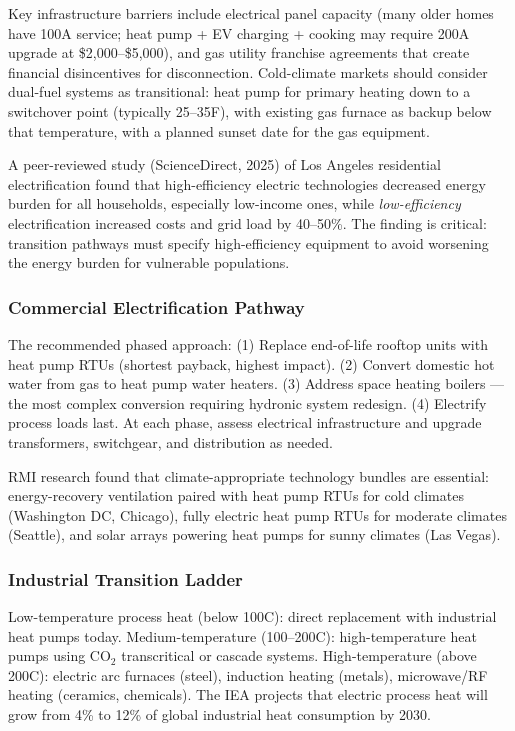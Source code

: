 \documentclass[11pt,letterpaper]{article}
\begin{document}
Key infrastructure barriers include electrical panel capacity (many older homes have 100A service; heat pump + EV charging + cooking may require 200A upgrade at \$2,000--\$5,000), and gas utility franchise agreements that create financial disincentives for disconnection. Cold-climate markets should consider dual-fuel systems as transitional: heat pump for primary heating down to a switchover point (typically 25--35\textdegree F), with existing gas furnace as backup below that temperature, with a planned sunset date for the gas equipment.

A peer-reviewed study (ScienceDirect, 2025) of Los Angeles residential electrification found that high-efficiency electric technologies decreased energy burden for all households, especially low-income ones, while \textit{low-efficiency} electrification increased costs and grid load by 40--50\%. The finding is critical: transition pathways must specify high-efficiency equipment to avoid worsening the energy burden for vulnerable populations.

\subsubsection{Commercial Electrification Pathway}
The recommended phased approach: (1) Replace end-of-life rooftop units with heat pump RTUs (shortest payback, highest impact). (2) Convert domestic hot water from gas to heat pump water heaters. (3) Address space heating boilers --- the most complex conversion requiring hydronic system redesign. (4) Electrify process loads last. At each phase, assess electrical infrastructure and upgrade transformers, switchgear, and distribution as needed.

RMI research found that climate-appropriate technology bundles are essential: energy-recovery ventilation paired with heat pump RTUs for cold climates (Washington DC, Chicago), fully electric heat pump RTUs for moderate climates (Seattle), and solar arrays powering heat pumps for sunny climates (Las Vegas).

\subsubsection{Industrial Transition Ladder}
Low-temperature process heat (below 100\textdegree C): direct replacement with industrial heat pumps today. Medium-temperature (100--200\textdegree C): high-temperature heat pumps using CO$_2$ transcritical or cascade systems. High-temperature (above 200\textdegree C): electric arc furnaces (steel), induction heating (metals), microwave/RF heating (ceramics, chemicals). The IEA projects that electric process heat will grow from 4\% to 12\% of global industrial heat consumption by 2030.
\end{document}
